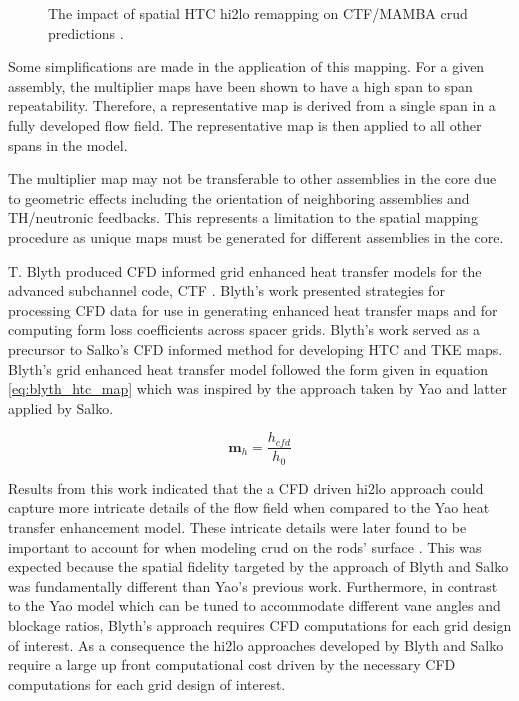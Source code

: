 \begin{figure}[H]%
    \centering
    \qquad
    \caption[The impact of spatial HTC hi2lo remapping on CTF/MAMBA crud predictions.]{The impact of spatial HTC hi2lo remapping on CTF/MAMBA crud predictions \cite{salko17}.}%
    \label{fig:htc_remap_crud}%
\end{figure}


Some simplifications are made in the application of this mapping.  For a given assembly, the multiplier maps have been shown to have a high span to span repeatability.  Therefore, a representative map is derived from a single span in a fully developed flow field.  The representative map is then applied to all other spans in the model.

The multiplier map may not be transferable to other assemblies in the core due to geometric effects including the orientation of neighboring assemblies and TH/neutronic feedbacks.  This represents a limitation to the spatial mapping procedure as unique maps must be generated for different assemblies in the core.

T. Blyth produced CFD informed grid enhanced heat transfer models for the advanced subchannel code, CTF \cite{blyth2014} \cite{blyth2017}.  Blyth's work presented strategies for processing CFD data for use in generating enhanced heat transfer maps and for computing form loss coefficients across spacer grids.  Blyth's work served as a precursor to Salko's CFD informed method for developing HTC and TKE maps.  Blyth's grid enhanced heat transfer model followed the form given in equation \ref{eq:blyth_htc_map} which was inspired by the approach taken by Yao and latter applied by Salko.

\begin{equation}
\mathbf m_h = \frac{h_{cfd}}{h_0}
\label{eq:blyth_htc_map}
\end{equation}

Results from this work indicated that the a CFD driven hi2lo approach could capture more intricate details of the flow field when compared to the Yao heat transfer enhancement model.  These intricate details were later found to be important to account for when modeling crud on the rods' surface \cite{slattery16}.   This was expected because the spatial fidelity targeted by the approach of Blyth and Salko was fundamentally different than Yao's previous work.  Furthermore, in contrast to the Yao model which can be tuned to accommodate different vane angles and blockage ratios,  Blyth's approach requires CFD computations for each grid design of interest. 
As a consequence the hi2lo approaches developed by Blyth and Salko require a large up front computational cost driven by the necessary CFD computations for each grid design of interest.

